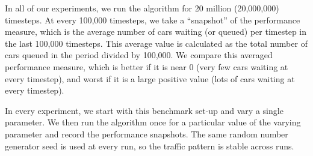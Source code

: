 In all of our experiments, we run the algorithm for 20 million (20,000,000)
timesteps. At every 100,000 timesteps, we take a ``snapshot'' of the
performance measure, which is the average number of cars waiting (or queued)
per timestep in the last 100,000 timesteps. This average value is calculated
as the total number of cars queued in the period divided by 100,000. We
compare this averaged performance measure, which is better if it is
near 0 (very few cars waiting at every timestep), and worst
if it is a large positive value (lots of cars waiting at every timestep).

In every experiment, we start with this benchmark set-up and
vary a single parameter. We then run the algorithm once for a particular
value of the varying parameter and record the performance snapshots.
The same random number generator seed is used at every run, so the
traffic pattern is stable across runs.
